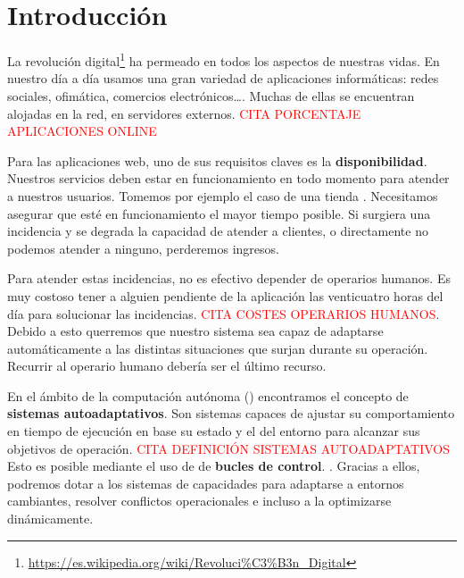 
\chapter{Introducción}
\label{chap:introduccion}

La revolución digital\footnote{\url{https://es.wikipedia.org/wiki/Revoluci\%C3\%B3n_Digital}} ha permeado en todos los aspectos de nuestras vidas. En nuestro día a día usamos una gran variedad de aplicaciones informáticas: redes sociales, ofimática, comercios electrónicos\dots. Muchas de ellas se encuentran alojadas en la red, en servidores externos. \textcolor{red}{CITA PORCENTAJE APLICACIONES ONLINE}

Para las aplicaciones web, uno de sus requisitos claves es la \textbf{disponibilidad}. Nuestros servicios deben estar en funcionamiento en todo momento para atender a nuestros usuarios. Tomemos por ejemplo el caso de una tienda . Necesitamos asegurar que esté en funcionamiento el mayor tiempo posible. Si surgiera una incidencia y se degrada la capacidad de atender a clientes, o directamente no podemos atender a ninguno, perderemos ingresos.

Para atender estas incidencias, no es efectivo depender de operarios humanos. Es muy costoso tener a alguien pendiente de la aplicación las venticuatro horas del día para solucionar las incidencias. \textcolor{red}{CITA COSTES OPERARIOS HUMANOS}. Debido a esto querremos que nuestro sistema sea capaz de adaptarse automáticamente a las distintas situaciones que surjan durante su operación. Recurrir al operario humano debería ser el último recurso.

En el ámbito de la computación autónoma () encontramos el concepto de \textbf{sistemas autoadaptativos}. Son sistemas capaces de ajustar su comportamiento en tiempo de ejecución en base su estado y el del entorno para alcanzar sus objetivos de operación. \textcolor{red}{CITA DEFINICIÓN SISTEMAS AUTOADAPTATIVOS} Esto es posible mediante el uso de de \textbf{bucles de control}. \cite{brunEngineeringSelfAdaptiveSystems2009}. Gracias a ellos, podremos dotar a los sistemas de capacidades para adaptarse a entornos cambiantes, resolver conflictos operacionales e incluso a la optimizarse dinámicamente.

